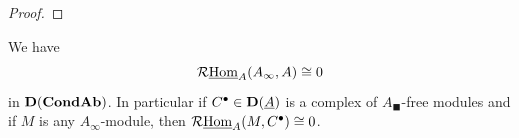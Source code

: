 \begin{proof}
%	
%	
%	
%		
\end{proof}

\begin{lemma}
	\label{lemma: Ainfty-modules admit no extensions, f.g. case}
	
	We have
		$$\mathcal{R}{\underline{\operatorname{Hom}}}_A(A_\infty, A) \cong 0$$
	in ${{\mathbf{D}}({{{\mathbf{Cond}}}{{\mathbf{Ab}}}})}$. In particular if $C^\bullet \in {{\mathbf{D}}(\underline{A})}$ is a complex of $A_\blacksquare$-free modules and if $M$ is any $A_\infty$-module, then $\mathcal{R}{\underline{\operatorname{Hom}}}_A(M, C^\bullet)\cong 0$.
\end{lemma}
